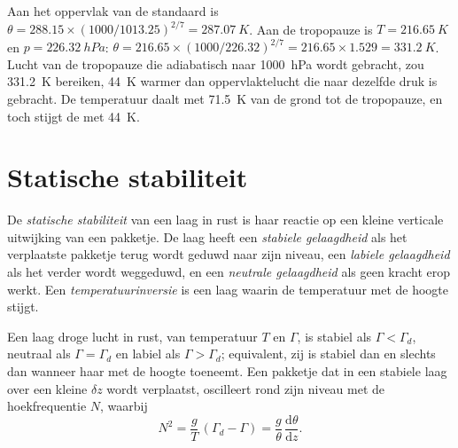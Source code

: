 \begin{example}\label{ex:b1:fluid-envelopes-structure:tropopause}
Aan het oppervlak van de standaard is $\theta = 288.15 \times (1000/1013.25)^{2/7} =
\qty{287.07}{K}$. Aan de tropopauze is $T = \qty{216.65}{K}$ en $p =
\qty{226.32}{hPa}$: $\theta = 216.65 \times (1000/226.32)^{2/7} = 216.65 \times
1.529 = \qty{331.2}{K}$. Lucht van de tropopauze die adiabatisch naar
\qty{1000}{hPa} wordt gebracht, zou \qty{331.2}{K} bereiken, \qty{44}{K} warmer dan oppervlaktelucht die naar dezelfde druk is gebracht. De temperatuur daalt met
\qty{71.5}{K} van de grond tot de tropopauze, en toch stijgt de  met
\qty{44}{K}.
\end{example}

\section{Statische stabiliteit}\label{sec:b1:fluid-envelopes-structure:stability}

\begin{definition}\label{def:b1:fluid-envelopes-structure:stability}
De \emph{statische stabiliteit} van een laag in rust is haar reactie op een kleine verticale uitwijking van een pakketje. De laag heeft een \emph{stabiele gelaagdheid} als het verplaatste pakketje terug wordt geduwd naar zijn niveau, een \emph{labiele
gelaagdheid} als het verder wordt weggeduwd, en een \emph{neutrale gelaagdheid} als geen kracht erop werkt. Een \emph{temperatuurinversie} is een laag waarin de temperatuur met de hoogte stijgt.
\end{definition}

\begin{theorem}\label{thm:b1:fluid-envelopes-structure:stability}
Een laag droge lucht in rust, van temperatuur $T$ en  $\Gamma$, is stabiel als $\Gamma < \Gamma_d$, neutraal als $\Gamma = \Gamma_d$ en labiel als $\Gamma > \Gamma_d$; equivalent, zij is stabiel dan en slechts dan wanneer haar  met de hoogte toeneemt. Een pakketje dat in een stabiele laag over een kleine $\delta z$ wordt verplaatst, oscilleert rond zijn niveau met de hoekfrequentie $N$, waarbij
\[
  N^2 = \frac{g}{T}\,(\Gamma_d - \Gamma) = \frac{g}{\theta}\,\frac{\mathrm d\theta}{\mathrm dz}.
\]
\end{theorem}

